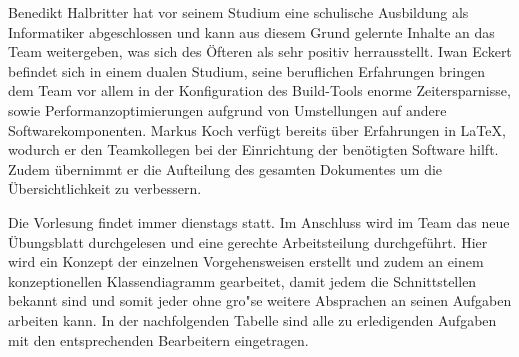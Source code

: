 Benedikt Halbritter hat vor seinem Studium eine schulische Ausbildung als Informatiker abgeschlossen und kann aus diesem Grund gelernte Inhalte an das Team weitergeben, was sich des \"Ofteren als sehr positiv herrausstellt.
Iwan Eckert befindet sich in einem dualen Studium, seine beruflichen Erfahrungen bringen dem Team vor allem in der Konfiguration des Build-Tools enorme Zeitersparnisse, sowie Performanzoptimierungen aufgrund von Umstellungen auf andere Softwarekomponenten.
Markus Koch verf\"ugt bereits \"uber Erfahrungen in LaTeX, wodurch er den Teamkollegen bei der Einrichtung der ben\"otigten Software hilft.
Zudem \"ubernimmt er die Aufteilung des gesamten Dokumentes um die \"Ubersichtlichkeit zu verbessern.

Die Vorlesung findet immer dienstags statt.
Im Anschluss wird im Team das neue \"Ubungsblatt durchgelesen und eine gerechte Arbeitsteilung durchgef\"uhrt.
Hier wird ein Konzept der einzelnen Vorgehensweisen erstellt und zudem an einem konzeptionellen Klassendiagramm gearbeitet, damit jedem die Schnittstellen bekannt sind und somit jeder ohne gro"se weitere Absprachen an seinen Aufgaben arbeiten kann.
In der nachfolgenden Tabelle sind alle zu erledigenden Aufgaben mit den entsprechenden Bearbeitern eingetragen.

